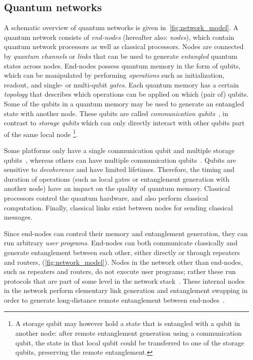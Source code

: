 \subsection{Quantum networks}
\label{sec:quantum_networks}
A schematic overview of quantum networks is given in~\cref{fig:network_model}.
A quantum network consists of \textit{end-nodes} (hereafter also: \textit{nodes}), which contain quantum network processors as well as classical processors.
Nodes are connected by \textit{quantum channels} or \textit{links} that can be used to generate \textit{entangled} quantum states across nodes.
End-nodes possess quantum memory in the form of qubits, which can be manipulated by performing \textit{operations} such as initialization, readout, and single- or multi-qubit \textit{gates}.
Each quantum memory has a certain \textit{topology} that describes which operations can be applied on which (pair of) qubits.
Some of the qubits in a quantum memory may be used to generate an entangled state with another node.
These qubits are called \emph{communication qubits}~\cite{dahlberg2019linklayer}, in contrast to \emph{storage qubits} which can only directly interact with other qubits part of the same local node
\footnote{A storage qubit may however hold a state that is entangled with a qubit in another node: after remote entanglement generation using a communication qubit, the state in that local qubit could be transferred to one of the storage qubits, preserving the remote entanglement.}.

Some platforms only have a single communication qubit and multiple storage qubits~\cite{Bernien2014}, whereas others can have multiple communication qubits~\cite{Inlek2017}.
Qubits are sensitive to \textit{decoherence} and have limited lifetimes.
Therefore, the timing and duration of operations (such as local gates or entanglement generation with another node) have an impact on the quality of quantum memory. Classical processors control the quantum hardware, and also perform classical computation.
Finally, classical links exist between nodes for sending classical messages.

Since end-nodes can control their memory and entanglement generation, they can run arbitrary \textit{user programs}.
End-nodes can both communicate classically and generate entanglement between each other, either directly or through repeaters and routers, (\cref{fig:network_model}). Nodes in the network other than end-nodes, such as repeaters and routers, do not execute user programs; rather these run protocols that are part of some level in the
network stack~\cite{dahlberg2019linklayer,kozlowski2020networklayer}.
These internal nodes in the network perform elementary link generation and entanglement swapping in order to generate long-distance remote entanglement between end-nodes~\cite{dahlberg2019linklayer}.

